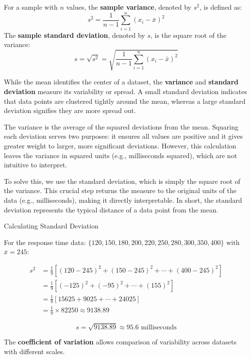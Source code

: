\begin{definition}
For a sample with $n$ values, the \textbf{sample variance}, denoted by $s^2$, is defined as:
$$
s^2 = \frac{1}{n-1}\sum_{i=1}^{n}(x_i - \bar{x})^2
$$
The \textbf{sample standard deviation}, denoted by $s$, is the square root of the variance:
$$
s = \sqrt{s^2} = \sqrt{\frac{1}{n-1}\sum_{i=1}^{n}(x_i - \bar{x})^2}
$$
\end{definition}

While the mean identifies the center of a dataset, the \textbf{variance} and \textbf{standard deviation} measure its variability or spread. A small standard deviation indicates that data points are clustered tightly around the mean, whereas a large standard deviation signifies they are more spread out.

The variance is the average of the squared deviations from the mean. Squaring each deviation serves two purposes: it ensures all values are positive and it gives greater weight to larger, more significant deviations. However, this calculation leaves the variance in squared units (e.g., milliseconds squared), which are not intuitive to interpret.

To solve this, we use the standard deviation, which is simply the square root of the variance. This crucial step returns the measure to the original units of the data (e.g., milliseconds), making it directly interpretable. In short, the standard deviation represents the typical distance of a data point from the mean.


\begin{example} Calculating Standard Deviation

    For the response time data: $\{120, 150, 180, 200, 220, 250, 280, 300, 350, 400\}$ with $\bar{x} = 245$:

\begin{align*}
s^2 &= \frac{1}{9}[(120-245)^2 + (150-245)^2 + \cdots + (400-245)^2] \\
&= \frac{1}{9}[(-125)^2 + (-95)^2 + \cdots + (155)^2] \\
&= \frac{1}{9}[15625 + 9025 + \cdots + 24025] \\
&= \frac{1}{9} \times 82250 \approx 9138.89
\end{align*}

\[
s = \sqrt{9138.89} \approx 95.6 \text{ milliseconds}
\]
\end{example}

The \textbf{coefficient of variation} allows comparison of variability across datasets with different scales.

